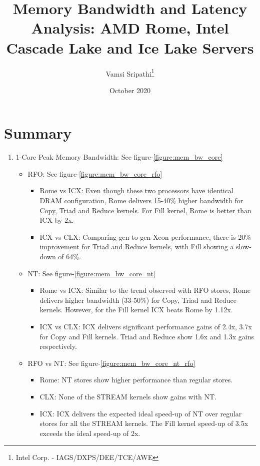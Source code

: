 \documentclass{article}
\begin{document}
\title{Memory Bandwidth and Latency Analysis: AMD Rome, Intel Cascade Lake and Ice Lake Servers}
\author{Vamsi Sripathi\thanks{Intel Corp. - IAGS/DXPS/DEE/TCE/AWE}}
\date{October 2020}
\maketitle

\tableofcontents
\listoffigures
\listoftables
\newpage

\section{Summary}
\begin{enumerate}
\item 1-Core Peak Memory Bandwidth: See figure-\ref{figure:mem_bw_core}

   \begin{itemize}
   \item RFO: See figure-\ref{figure:mem_bw_core_rfo}
       \begin{itemize}
          \item Rome vs ICX: Even though these two processors have identical DRAM configuration, Rome delivers 15-40\% higher bandwidth for Copy, Triad and Reduce kernels. For Fill kernel, Rome is better than ICX by 2x.
          \item ICX vs CLX: Comparing gen-to-gen Xeon performance, there is 20\% improvement for Triad and Reduce kernels, with Fill showing a slow-down of 64\%.
       \end{itemize}

   \item NT: See figure-\ref{figure:mem_bw_core_nt}
       \begin{itemize}
          \item Rome vs ICX: Similar to the trend observed with RFO stores, Rome delivers higher bandwidth (33-50\%) for Copy, Triad and Reduce kernels. However, for the Fill kernel ICX beats Rome by 1.12x.
          \item ICX vs CLX: ICX delivers significant performance gains of 2.4x, 3.7x for Copy and Fill kernels. Triad and Reduce show 1.6x and 1.3x gains respectively.
       \end{itemize}

   \item RFO vs NT:  See figure-\ref{figure:mem_bw_core_nt_rfo}
       \begin{itemize}
           \item Rome: NT stores show higher performance than regular stores.
           \item CLX: None of the STREAM kernels show gains with NT.
           \item ICX: ICX delivers the expected ideal speed-up of NT over regular stores for all the STREAM kernels. The Fill kernel speed-up of 3.5x exceeds the ideal speed-up of 2x.
       \end{itemize}


\end{itemize}
\end{enumerate}
\end{document}

